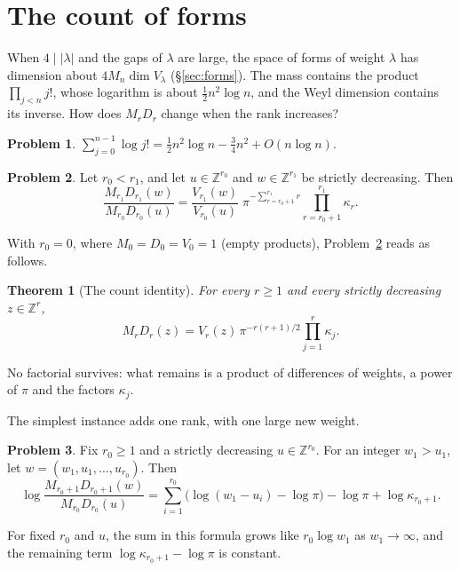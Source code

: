 \documentclass[reqno]{amsart}
\theoremstyle{definition}
\newtheorem{problem}{Problem}[section]
\theoremstyle{plain}
\newtheorem{theorem}{Theorem}[section]
\newcommand{\Z}{\mathbb{Z}}
\begin{document}
\section{The count of forms}\label{sec:count}

When \(4 \mid \lvert\lambda\rvert\) and the gaps of \(\lambda\) are large, the space of forms of weight \(\lambda\) has dimension about \(4 M_n \dim V_\lambda\) (\S\ref{sec:forms}).  The mass contains the product \(\prod_{j<n} j!\), whose logarithm is about \(\tfrac12 n^2 \log n\), and the Weyl dimension contains its inverse.  How does \(M_rD_r\) change when the rank increases?

\begin{problem}\label{pr:stirling}
\(\sum_{j=0}^{n-1} \log j! = \tfrac12 n^2 \log n - \tfrac34 n^2 + O(n \log n)\).
\end{problem}

\begin{problem}\label{pr:count}
Let \(r_0 < r_1\), and let \(u \in \Z^{r_0}\) and \(w \in \Z^{r_1}\) be strictly decreasing.  Then
\[
  \frac{M_{r_1} D_{r_1}(w)}{M_{r_0} D_{r_0}(u)}
  = \frac{V_{r_1}(w)}{V_{r_0}(u)}\; \pi^{-\sum_{r = r_0+1}^{r_1} r} \prod_{r = r_0+1}^{r_1} \kappa_r .
\]
\end{problem}

With \(r_0 = 0\), where \(M_0 = D_0 = V_0 = 1\) (empty products), Problem~\ref{pr:count} reads as follows.

\begin{theorem}[The count identity]\label{thm:count}
For every \(r \ge 1\) and every strictly decreasing \(z \in \Z^r\),
\[
  M_r D_r(z) = V_r(z)\, \pi^{-r(r+1)/2} \prod_{j=1}^{r} \kappa_j .
\]
\end{theorem}

No factorial survives: what remains is a product of differences of weights, a power of \(\pi\) and the factors \(\kappa_j\).

The simplest instance adds one rank, with one large new weight.

\begin{problem}\label{pr:one-row}
Fix \(r_0\ge1\) and a strictly decreasing \(u\in\Z^{r_0}\).  For an integer \(w_1>u_1\), let \(w=(w_1,u_1,\dots,u_{r_0})\).  Then
\[
  \log \frac{M_{r_0+1} D_{r_0+1}(w)}{M_{r_0} D_{r_0}(u)}
  = \sum_{i=1}^{r_0} \bigl( \log(w_1 - u_i) - \log \pi \bigr) - \log\pi + \log \kappa_{r_0+1} .
\]
\end{problem}

For fixed \(r_0\) and \(u\), the sum in this formula grows like \(r_0\log w_1\) as \(w_1\to\infty\), and the remaining term \(\log\kappa_{r_0+1}-\log\pi\) is constant.
\end{document}
